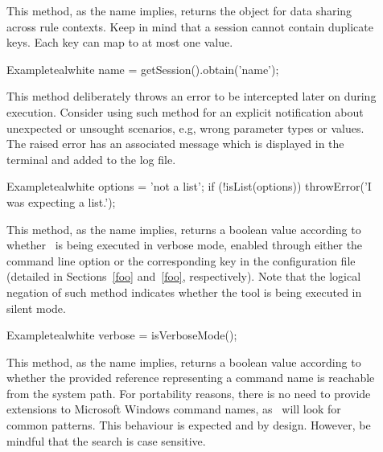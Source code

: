 \begin{description}
\item[] This method, as the name implies, returns the  object for data sharing across rule contexts. Keep in mind that a session cannot contain duplicate keys. Each key can map to at most one value.

\begin{codebox}{Example}{teal}{\icnote}{white}
name = getSession().obtain('name');
\end{codebox}

\item[] This method deliberately throws an error to be intercepted later on during execution. Consider using such method for an explicit notification about unexpected or unsought scenarios, e.g, wrong parameter types or values. The raised error has an associated message which is displayed in the terminal and added to the log file.

\begin{codebox}{Example}{teal}{\icnote}{white}
options = 'not a list';
if (!isList(options)) {
    throwError('I was expecting a list.');
}
\end{codebox}

\item[] This method, as the name implies, returns a boolean value according to whether \arara\ is being executed in verbose mode, enabled through either the  command line option or the corresponding key in the configuration file (detailed in Sections~\ref{foo} and~\ref{foo}, respectively). Note that the logical negation of such method indicates whether the tool is being executed in silent mode.

\begin{codebox}{Example}{teal}{\icnote}{white}
verbose = isVerboseMode();
\end{codebox}

\item[] This method, as the name implies, returns a boolean value according to whether the provided  reference representing a command name is reachable from the system path.  For portability reasons, there is no need to provide extensions to Microsoft Windows command names, as \arara\ will look for common patterns. This behaviour is expected and by design. However, be mindful that the search is case sensitive.


\end{description}
